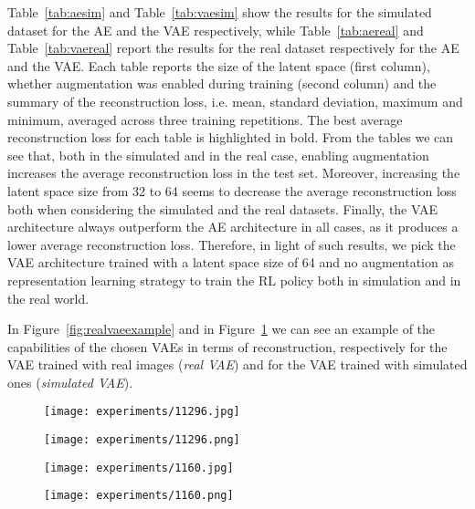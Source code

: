 
Table~\ref{tab:aesim} and Table~\ref{tab:vaesim} show the results for the simulated dataset for the AE and the VAE respectively, while Table~\ref{tab:aereal} and Table~\ref{tab:vaereal} report the results for the real dataset respectively for the AE and the VAE. Each table reports the size of the latent space (first column), whether augmentation was enabled during training (second column) and the summary of the reconstruction loss, i.e. mean, standard deviation, maximum and minimum, averaged across three training repetitions. The best average reconstruction loss for each table is highlighted in bold. From the tables we can see that, both in the simulated and in the real case, enabling augmentation increases the average reconstruction loss in the test set. Moreover, increasing the latent space size from 32 to 64 seems to decrease the average reconstruction loss both when considering the simulated and the real datasets. Finally, the VAE architecture always outperform the AE architecture in all cases, as it produces a lower average reconstruction loss. Therefore, in light of such results, we pick the VAE architecture trained with a latent space size of 64 and no augmentation as representation learning strategy to train the RL policy both in simulation and in the real world.

In Figure~\ref{fig:realvaeexample} and in Figure~\ref{fig:simvaeexample} we can see an example of the capabilities of the chosen VAEs in terms of reconstruction, respectively for the VAE trained with real images (\textit{real VAE}) and for the VAE trained with simulated ones (\textit{simulated VAE}).

\begin{figure}[h]
  \begin{minipage}{.50\textwidth}
    \centering
    \texttt{[image: experiments/11296.jpg]}
  \end{minipage}%
  \begin{minipage}{.50\textwidth}
      \centering
      \texttt{[image: experiments/11296.png]}
  \end{minipage}
  \label{fig:realvaeexample}
  \begin{minipage}{.50\textwidth}
    \centering
    \texttt{[image: experiments/1160.jpg]}
  \end{minipage}%
  \begin{minipage}{.50\textwidth}
      \centering
      \texttt{[image: experiments/1160.png]}
  \end{minipage}
  \label{fig:simvaeexample}
\end{figure}

